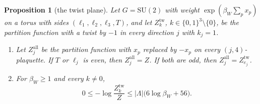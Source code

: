 \documentclass[11pt,a4paper]{amsart}
\newtheorem{proposition}[theorem]{Proposition}
\theoremstyle{definition}
\theoremstyle{remark}
\numberwithin{equation}{section}
\newcommand{\abs}[1]{\lvert #1\rvert}      %
\newcommand{\SU}{\mathrm{SU}}              %
\newcommand{\betaW}{\beta_{W}}             %
\begin{document}
\begin{proposition}[the twist plane]\label{prop:chessboard}
Let $G=\SU(2)$ with weight $\exp(\betaW\sum_px_p)$ on a torus with sides $(\ell_1,\ell_2,\ell_3,T)$, and let $Z^{\mathrm{tw}}_k$, $k\in\{0,1\}^3\setminus\{0\}$, be the partition function with a twist by $-1$ in every direction $j$ with $k_j=1$.
\begin{enumerate}[label=\textup{(\alph*)},leftmargin=*]
\item Let $Z^{\mathrm{all}}_j$ be the partition function with $x_p$ replaced by $-x_p$ on every $(j,4)$-plaquette. If $T$ or $\ell_j$ is even, then $Z^{\mathrm{all}}_j=Z$. If both are odd, then $Z^{\mathrm{all}}_j=Z^{\mathrm{tw}}_{e_j}$.
\item For $\betaW\ge1$ and every $k\ne0$,
\[
0\le-\log\frac{Z^{\mathrm{tw}}_k}{Z}\le\abs{\Lambda}\bigl(6\log\betaW+56\bigr).
\]
\end{enumerate}
\end{proposition}
\end{document}
